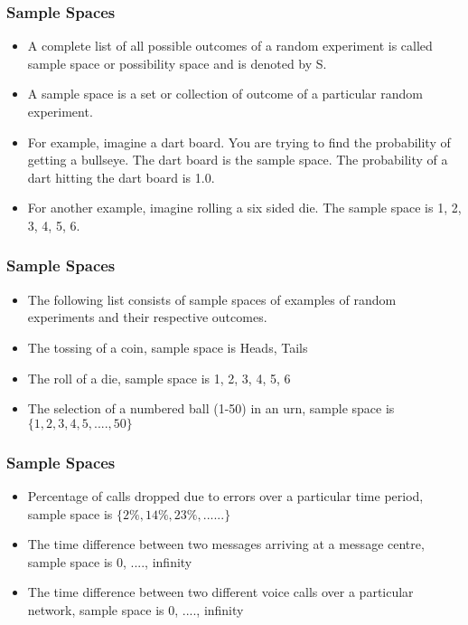 \documentclass[IntroMain.tex]{subfiles}
\begin{document}
\begin{frame}
	\frametitle{Sample Spaces}
	
	\begin{itemize}
	\item	A complete list of all possible outcomes of a random experiment is called sample space or possibility space and is denoted by S.
		
		
	\item	A sample space is a set or collection of outcome of a particular random experiment.
		
	\item 	For example, imagine a dart board. You are trying to find the probability of getting a bullseye. The dart board is the sample space. The probability of a dart hitting the dart board is 1.0.
	\item For another example, imagine rolling a six sided die. The sample space is {1, 2, 3, 4, 5, 6}.
	\end{itemize}

	
\end{frame}
\begin{frame}
	\frametitle{Sample Spaces}
	\Large
	\begin{itemize}
\item	The following list consists of sample spaces of examples of random experiments and their respective outcomes.
	
\item	The tossing of a coin, sample space is {Heads, Tails}
	
\item 	The roll of a die, sample space is {1, 2, 3, 4, 5, 6}
	
\item The selection of a numbered ball (1-50) in an urn, sample space is $\{1, 2, 3, 4, 5, ...., 50\}$
	\end{itemize}
	
	
\end{frame}

\begin{frame}
	\frametitle{Sample Spaces}
	
	\begin{itemize}
	\item Percentage of calls dropped due to errors over a particular time period, sample space is $\{2\%, 14\%, 23\%, ......\}$
	
	\item The time difference between two messages arriving at a message centre, sample space is {0, ...., infinity}
	
	\item The time difference between two different voice calls over a particular network, sample space is {0, ...., infinity}
	\end{itemize}

		
	\end{frame}

\end{document}

